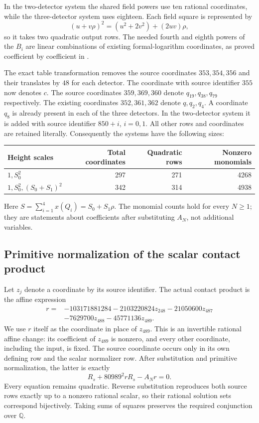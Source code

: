 \documentclass[11pt,a4paper]{article}
\theoremstyle{remark}\newtheorem{remark}[theorem]{Remark}
\newcommand{\Q}{\mathbb Q}\newcommand{\Z}{\mathbb Z}\newcommand{\HH}{\mathcal H}
\begin{document}
In the two-detector system the shared field powers use ten rational
coordinates, while the three-detector system uses eighteen. Each field
square is represented by
\[
 (u+v\rho)^2=(u^2+2v^2)+(2uv)\rho,
\]
so it takes two quadratic output rows. The needed fourth and eighth
powers of the $B_i$ are linear combinations of existing formal-logarithm
coordinates, as proved coefficient by coefficient in \cite{Packing}.

The exact table transformation removes the source coordinates
$353,354,356$ and their translates by $48$ for each detector. The
coordinate with source identifier $355$ now denotes $c$. The source
coordinates $359,369,360$ denote $q_{19},q_{38},q_{79}$ respectively.
The existing coordinates $352,361,362$ denote $q,q_2,q_4$. A coordinate
$q_8$ is already present in each of the three detectors. In the
two-detector system it is added with source identifier $850+i$,
$i=0,1$. All other rows and coordinates are retained literally.
Consequently the systems have the following sizes:
\begin{center}
\begin{tabular}{lrrr}
\toprule
Height scales&Total coordinates&Quadratic rows&Nonzero monomials\\\midrule
$1,S_0^2$&297&271&4268\\
$1,S_0^2,(S_0+S_1)^2$&342&314&4938\\\bottomrule
\end{tabular}
\end{center}
Here $S=\sum_{i=1}^4x(Q_i)=S_0+S_1\rho$. The monomial counts hold for
every $N\ge1$; they are statements about coefficients after substituting
$A_N$, not additional variables.


\subsection{Primitive normalization of the scalar contact product}
Let $z_j$ denote a coordinate by its source identifier. The actual
contact product is the affine expression
\[
 \begin{aligned}
 r={}&-103171881284-2103220824z_{248}-21050600z_{487}\\
     &-7629700z_{488}-45771136z_{489}.
 \end{aligned}
\]
We use $r$ itself as the coordinate in place of $z_{489}$. This is an
invertible rational affine change: its coefficient of $z_{489}$ is
nonzero, and every other coordinate, including the input, is fixed.
The source coordinate occurs only in its own defining row and the
scalar normalizer row. After substitution and primitive normalization,
the latter is exactly
\[
                  R_s+80989^2rR_s-A_Nr=0.
\]
Every equation remains quadratic. Reverse substitution reproduces both
source rows exactly up to a nonzero rational scalar, so their rational
solution sets correspond bijectively. Taking sums of squares preserves
the required conjunction over $\Q$.
\end{document}

